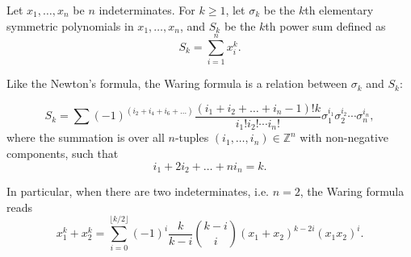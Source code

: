 \documentclass[12pt]{article}
\begin{document}
Let $x_1,\ldots, x_n$ be $n$ indeterminates. For $k\geq 1$, let
$\sigma_k$ be the $k$th elementary symmetric polynomials in $x_1,
\ldots, x_n$, and $S_k$ be the $k$th power sum defined as
\[
  S_k = \sum_{i=1}^n x_i^k.
\]

Like the Newton's formula, the Waring formula is a relation
between $\sigma_k$ and $S_k$:

\[S_k = \sum (-1)^{(i_2+i_4+i_6+\ldots)} \frac{(i_1+i_2+\ldots+i_n-1)!k}{i_1!i_2!\cdots i_n!}
\sigma_1^{i_1} \sigma_2^{i_2} \cdots \sigma_n^{i_n},
\]
where the summation is over all $n$-tuples $(i_1,\ldots, i_n)\in\mathbb{Z}^n$ with non-negative components, such that
\[
i_1+2i_2+\ldots+ni_n = k.
\]

In particular, when there are two indeterminates, i.e. $n=2$, the
Waring formula reads
\[
  x_1^k + x_2^k = \sum_{i=0}^{\lfloor k/2 \rfloor}
  (-1)^i\frac{k}{k-i}\binom{k-i}{i}(x_1+x_2)^{k-2i}(x_1x_2)^i.
\]
\end{document}
